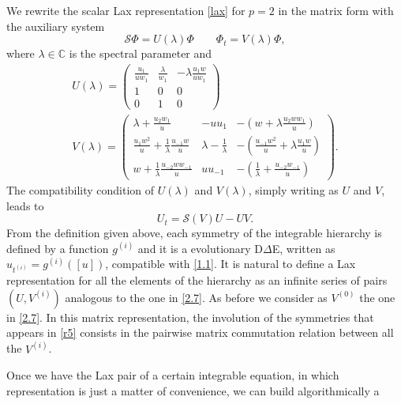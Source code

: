 \documentclass[fleqn,11pt,twoside]{article}
\theoremstyle{definition}
\begin{document}
We rewrite the scalar Lax representation
\eqref{lax} for $p=2$ in the matrix form with the auxiliary system
	\begin{equation*}
		\mathcal{S} \Phi = U(\lambda) \Phi \qquad \Phi_t = V(\lambda) \Phi,
		\label{newaux}
	\end{equation*}
where $\lambda \in \mathbb{C}$ is the spectral parameter and
	\begin{subequations}
		\begin{gather}
			U(\lambda)=\begin{pmatrix}
				\frac{u_1}{u w_1} & \frac{\lambda}{w_1} &
-\lambda \frac{u_1 w}{u w_1}\\
				1 & 0 & 0\\
				0 & 1 & 0
			\end{pmatrix} \label{2.71}\\
			V(\lambda)=\begin{pmatrix}
				\lambda +\frac{u_2 w_1}{u} & -u u_1  &
-\left(w+\lambda\frac{u_2 w w_1}{u}\right)\\
				\frac{u_1 w^2}{u} +
\frac{1}{\lambda}\frac{u_{-1} w}{u} & \lambda - \frac{1}{\lambda} &
-\left(\frac{u_{-1} w^2}{u} + \lambda\frac{u_1 w}{u}\right)\\
				w+\frac{1}{\lambda}\frac{u_{-2} w w_{-1}}{u}& u
u_{-1} & -\left(\frac{1}{\lambda} +\frac{u_{-2} w_{-1}}{u}\right)
			\end{pmatrix}. \label{2.72}
		\end{gather}
		\label{2.7}
	\end{subequations}
The compatibility condition of $U(\lambda)$ and $V(\lambda)$, simply writing as $U$ and $V$, leads to
	\begin{equation*}
		U_t = \mathcal{S}(V)U - U V.
		\label{2.5}
	\end{equation*}
\iffalse
	From the definition given above, each symmetry of the integrable
hierarchy is defined by a function $g^{(i)}$ and it is a evolutionary
D$\Delta$E, written as $u_{t^{(i)}} = g^{(i)}([u])$, compatible with
\eqref{1.1}. It is natural to define a Lax representation for all the elements
of the hierarchy as an infinite series of pairs $(U, V^{(i)})$ analogous to the
one in \eqref{2.7}. As before we consider as $V^{(0)}$ the one in \eqref{2.7}.
In this matrix representation, the involution of the symmetries that appears in
\eqref{r5} consists in the pairwise matrix commutation relation between all the
$V^{(i)}$.\par
	Once we have the Lax pair of a certain integrable equation, in which
representation is just a matter of convenience, we can build algorithmically a
\end{document}
